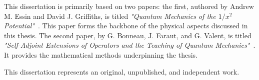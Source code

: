 This dissertation is primarily based on two papers: the first, authored by Andrew M. Essin and David J. Griffiths, is titled \textit{"Quantum Mechanics of the $1/x^2$ Potential"}~\cite{EssinGriffiths:10.1119/1.2165248}. This paper forms the backbone of the physical aspects discussed in this thesis. The second paper, by G. Bonneau, J. Faraut, and G. Valent, is titled \textit{"Self-Adjoint Extensions of Operators and the Teaching of Quantum Mechanics"}~\cite{Bonneau_2001}. It provides the mathematical methods underpinning the thesis.

\vspace{2mm}
\noindent
This dissertation represents an original, unpublished, and independent work.